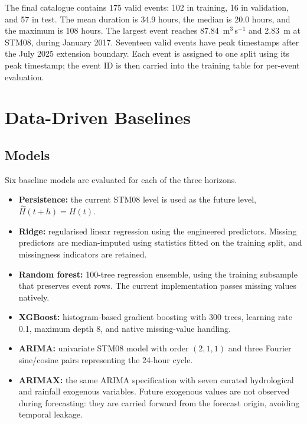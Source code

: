 \documentclass[twocolumn,twoside,a4paper,10pt]{IEEEtran}
\begin{document}
The final catalogue contains 175 valid events: 102 in training, 16 in
validation, and 57 in test. The mean duration is 34.9 hours, the median is
20.0 hours, and the maximum is 108 hours. The largest event reaches
87.84~m$^{3}$\,s$^{-1}$ and 2.83~m at STM08, during January 2017. Seventeen
valid events have peak timestamps after the July 2025 extension boundary.
Each event is assigned to one split using its peak timestamp; the event ID is
then carried into the training table for per-event evaluation.

\section{Data-Driven Baselines\label{sec:baselines}}

\subsection{Models}

Six baseline models are evaluated for each of the three horizons.

\begin{itemize}
    \item \textbf{Persistence:} the current STM08 level is used as the future
    level, $\hat{H}(t+h)=H(t)$.
    \item \textbf{Ridge:} regularised linear regression using the engineered
    predictors. Missing predictors are median-imputed using statistics fitted
    on the training split, and missingness indicators are retained.
    \item \textbf{Random forest:} 100-tree regression ensemble, using the
    training subsample that preserves event rows. The current implementation
    passes missing values natively.
    \item \textbf{XGBoost:} histogram-based gradient boosting with 300 trees,
    learning rate 0.1, maximum depth 8, and native missing-value handling.
    \item \textbf{ARIMA:} univariate STM08 model with order $(2,1,1)$ and
    three Fourier sine/cosine pairs representing the 24-hour cycle.
    \item \textbf{ARIMAX:} the same ARIMA specification with seven curated
    hydrological and rainfall exogenous variables. Future exogenous values
    are not observed during forecasting: they are carried forward from the
    forecast origin, avoiding temporal leakage.
\end{itemize}
\end{document}
